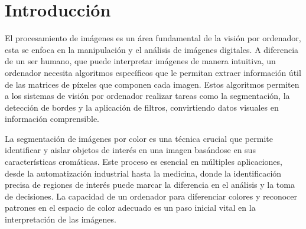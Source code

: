 \documentclass[a4paper,12pt]{article}
\newcommand{\vacio}{\textcolor{white}{ .}}
\begin{document}
{%

\renewcommand{\headrulewidth}{0.5pt}

\pagestyle{fancy}
\renewcommand{\footrulewidth}{0.5pt}
\fancyfoot[C]{\vacio}

\newpage

\renewcommand{\contentsname}{Índice}
\tableofcontents
{}

\newpage


\section{Introducción}


\vspace{1cm}

El procesamiento de imágenes es un área fundamental de la visión por ordenador, esta se enfoca en la manipulación y el análisis
de imágenes digitales. A diferencia de un ser humano, que puede interpretar imágenes de manera intuitiva, un ordenador necesita
algoritmos específicos que le permitan extraer información útil de las matrices de píxeles que componen cada imagen. Estos 
algoritmos permiten a los sistemas de visión por ordenador realizar tareas como la segmentación, la detección de bordes 
y la aplicación de filtros, convirtiendo datos visuales en información comprensible.

\vspace{0.5cm}

La segmentación de imágenes por color es una técnica crucial que permite identificar y aislar objetos de interés en una imagen 
basándose en sus características cromáticas. Este proceso es esencial en múltiples aplicaciones, desde la automatización 
industrial hasta la medicina, donde la identificación precisa de regiones de interés puede marcar la diferencia en el análisis
y la toma de decisiones. La capacidad de un ordenador para diferenciar colores y reconocer patrones en el espacio de color 
adecuado es un paso inicial vital en la interpretación de las imágenes.

}
\end{document}
